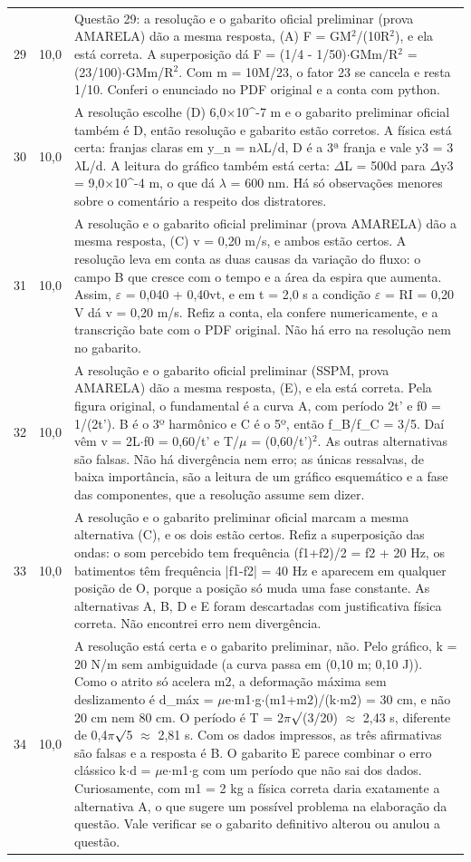 \documentclass{article}%
\begin{document}
\begin{longtable}{@{}c c p{}@{}}
29 & 10,0 & Questão 29: a resolução e o gabarito oficial preliminar (prova AMARELA) dão a mesma resposta, (A) F = GM$^2$/(10R$^2$), e ela está correta. A superposição dá F = (1/4 - 1/50)$\cdot$GMm/R$^2$ = (23/100)$\cdot$GMm/R$^2$. Com m = 10M/23, o fator 23 se cancela e resta 1/10. Conferi o enunciado no PDF original e a conta com python. \\
30 & 10,0 & A resolução escolhe (D) 6,0$\times$10\^{}{-}7 m e o gabarito preliminar oficial também é D, então resolução e gabarito estão corretos. A física está certa: franjas claras em y\_n = n$\lambda$L/d, D é a 3ª franja e vale y3 = 3$\lambda$L/d. A leitura do gráfico também está certa: $\Delta$L = 500d para $\Delta$y3 = 9,0$\times$10\^{}{-}4 m, o que dá $\lambda$ = 600 nm. Há só observações menores sobre o comentário a respeito dos distratores. \\
31 & 10,0 & A resolução e o gabarito oficial preliminar (prova AMARELA) dão a mesma resposta, (C) v = 0,20 m/s, e ambos estão certos. A resolução leva em conta as duas causas da variação do fluxo: o campo B que cresce com o tempo e a área da espira que aumenta. Assim, $\varepsilon$ = 0,040 + 0,40vt, e em t = 2,0 s a condição $\varepsilon$ = RI = 0,20 V dá v = 0,20 m/s. Refiz a conta, ela confere numericamente, e a transcrição bate com o PDF original. Não há erro na resolução nem no gabarito. \\
32 & 10,0 & A resolução e o gabarito oficial preliminar (SSPM, prova AMARELA) dão a mesma resposta, (E), e ela está correta. Pela figura original, o fundamental é a curva A, com período 2t' e f0 = 1/(2t'). B é o 3º harmônico e C é o 5º, então f\_B/f\_C = 3/5. Daí vêm v = 2L$\cdot$f0 = 0,60/t' e T/$\mu$ = (0,60/t')$^2$. As outras alternativas são falsas. Não há divergência nem erro; as únicas ressalvas, de baixa importância, são a leitura de um gráfico esquemático e a fase das componentes, que a resolução assume sem dizer. \\
33 & 10,0 & A resolução e o gabarito preliminar oficial marcam a mesma alternativa (C), e os dois estão certos. Refiz a superposição das ondas: o som percebido tem frequência (f1+f2)/2 = f2 + 20 Hz, os batimentos têm frequência |f1-f2| = 40 Hz e aparecem em qualquer posição de O, porque a posição só muda uma fase constante. As alternativas A, B, D e E foram descartadas com justificativa física correta. Não encontrei erro nem divergência. \\
34 & 10,0 & A resolução está certa e o gabarito preliminar, não. Pelo gráfico, k = 20 N/m sem ambiguidade (a curva passa em (0,10 m; 0,10 J)). Como o atrito só acelera m2, a deformação máxima sem deslizamento é d\_máx = $\mu$e$\cdot$m1$\cdot$g$\cdot$(m1+m2)/(k$\cdot$m2) = 30 cm, e não 20 cm nem 80 cm. O período é T = 2$\pi$$\surd$(3/20) $\approx$ 2,43 s, diferente de 0,4$\pi$$\surd$5 $\approx$ 2,81 s. Com os dados impressos, as três afirmativas são falsas e a resposta é B. O gabarito E parece combinar o erro clássico k$\cdot$d = $\mu$e$\cdot$m1$\cdot$g com um período que não sai dos dados. Curiosamente, com m1 = 2 kg a física correta daria exatamente a alternativa A, o que sugere um possível problema na elaboração da questão. Vale verificar se o gabarito definitivo alterou ou anulou a questão. \\

\end{longtable}
\end{document}
